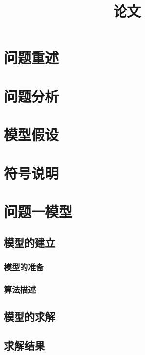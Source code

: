 \documentclass[withoutpreface,bwprint]{cumcmthesis} %
\title{论文}
\begin{document}
	
	\maketitle
	\begin{abstract}
		
		
	\end{abstract}
	
	\tableofcontents
	
	\newpage
	
	\section{问题重述}
	
	
	\section{问题分析}
	
	
	\section{模型假设}
	
	
	\section{符号说明}
	
	
	\section{问题一模型}
		\subsection{模型的建立}
		
			\subsubsection{模型的准备}
		
			\subsubsection{算法描述}
	
		\subsection{模型的求解}
	
	
		\subsection{求解结果}
	
\end{document}
